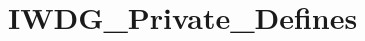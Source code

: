 \hypertarget{group___i_w_d_g___private___defines}{\section{I\-W\-D\-G\-\_\-\-Private\-\_\-\-Defines}
\label{group___i_w_d_g___private___defines}
}

